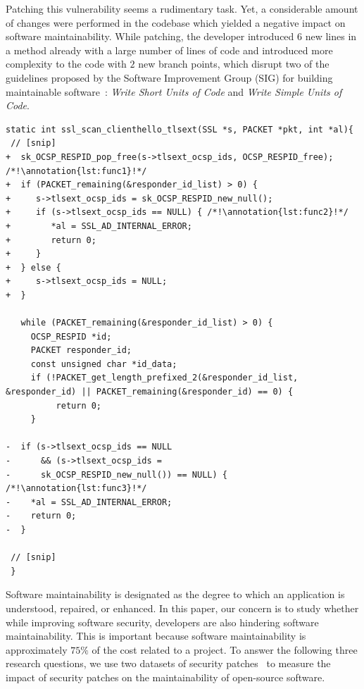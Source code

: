 \documentclass[smallextended]{svjour3}       %
\newcounter{lstannotation}
\renewcommand{\thelstannotation}{\ding{\number\numexpr181+\arabic{lstannotation}}}
\newcommand{\annotation}[1]{\refstepcounter{lstannotation}\label{#1}\thelstannotation}
\begin{document}
Patching this vulnerability seems a rudimentary task. Yet,
a considerable amount of changes were performed in the codebase 
which yielded a negative impact on software maintainability.
While patching, the developer introduced $6$ new lines in a method 
already with a large number of lines of code and introduced more 
complexity to the code with $2$ new branch points, which disrupt two of 
the guidelines proposed by the Software Improvement Group 
(SIG) for building maintainable software~\cite{Visser:2016:OREILLY}: 
\emph{Write Short Units of Code} and \emph{Write Simple Units of 
Code}. 

\medskip
\setcounter{lstannotation}{0}
\begin{lstlisting}[style={CStyle}, caption={Patch provided by OpenSSL developers to the
CVE-2016-6304 vulnerability on file ssl/t1\_lib.c},label={lst:vuln}]
static int ssl_scan_clienthello_tlsext(SSL *s, PACKET *pkt, int *al){ 
 // [snip]
+  sk_OCSP_RESPID_pop_free(s->tlsext_ocsp_ids, OCSP_RESPID_free); /*!\annotation{lst:func1}!*/
+  if (PACKET_remaining(&responder_id_list) > 0) { 
+     s->tlsext_ocsp_ids = sk_OCSP_RESPID_new_null();
+     if (s->tlsext_ocsp_ids == NULL) { /*!\annotation{lst:func2}!*/
+        *al = SSL_AD_INTERNAL_ERROR;
+        return 0;
+     }
+  } else {
+     s->tlsext_ocsp_ids = NULL;
+  }

   while (PACKET_remaining(&responder_id_list) > 0) {
     OCSP_RESPID *id;
     PACKET responder_id;
     const unsigned char *id_data;
     if (!PACKET_get_length_prefixed_2(&responder_id_list, &responder_id) || PACKET_remaining(&responder_id) == 0) {
          return 0;
     }

-  if (s->tlsext_ocsp_ids == NULL 
-      && (s->tlsext_ocsp_ids = 
-      sk_OCSP_RESPID_new_null()) == NULL) { /*!\annotation{lst:func3}!*/
-    *al = SSL_AD_INTERNAL_ERROR;
-    return 0;
-  }

 // [snip]
 }
\end{lstlisting}

Software maintainability is designated as the degree to which an 
application is understood, repaired, or enhanced. In this paper, our 
concern is to study whether while improving software security, 
developers are also hindering software maintainability. This is 
important because software 
maintainability is approximately $75\%$ of the cost related to a 
project. To answer the following three research questions, we use 
two datasets of security 
patches~\cite{Reis:2017:IJSSE,10.1109/MSR.2019.00064} to measure the 
impact of security patches on the maintainability of open-source 
software. 
%
\end{document}
